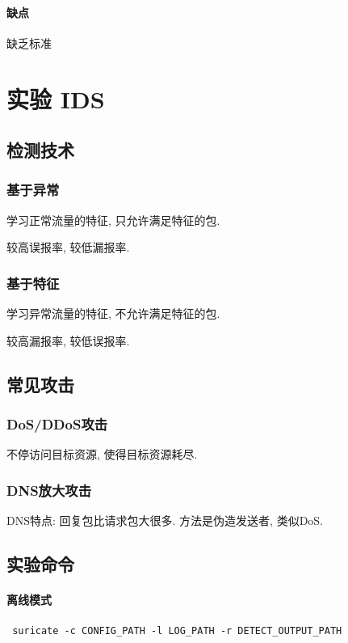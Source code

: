 \documentclass{ctexart}
\begin{document}
\paragraph{缺点} 缺乏标准


\pagebreak \appendix
 
\section{实验 IDS}
\subsection{检测技术}
\subsubsection{基于异常}
    学习正常流量的特征, 只允许满足特征的包.\par
    较高误报率, 较低漏报率.
\subsubsection{基于特征}
    学习异常流量的特征, 不允许满足特征的包.\par
    较高漏报率, 较低误报率.
\subsection{常见攻击}
\subsubsection{DoS/DDoS攻击}
    不停访问目标资源, 使得目标资源耗尽.
\subsubsection{DNS放大攻击}
    DNS特点: 回复包比请求包大很多. 方法是伪造发送者, 类似DoS.
\subsection{实验命令}
\paragraph{离线模式}
\begin{verbatim} suricate -c CONFIG_PATH -l LOG_PATH -r DETECT_OUTPUT_PATH \end{verbatim}
\end{document}
